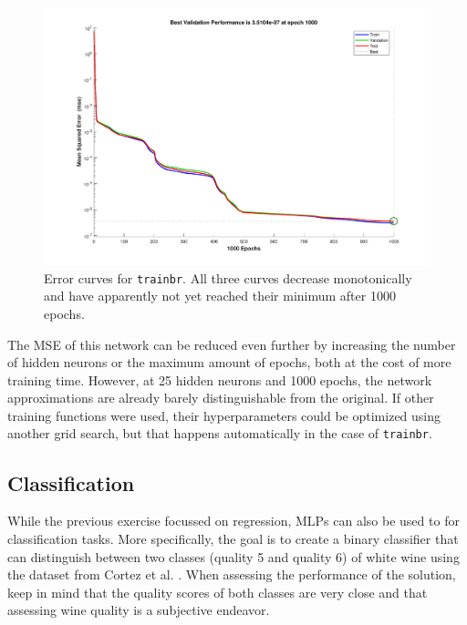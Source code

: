 \documentclass[a4, 10pt, twoside, twocolumn]{article}
\numberwithin{figure}{section}
\begin{document}
\begin{figure}[ht]
    \includegraphics[width=\linewidth]{img/Regression_trainbr_Perf.pdf}
    \caption{Error curves for \texttt{trainbr}. All three curves decrease monotonically and have apparently not yet reached their minimum after 1000 epochs.}
    \label{fig:Regression_trainbr_Perf}
\end{figure}

The MSE of this network can be reduced even further by increasing the number of hidden neurons or the maximum amount of epochs, both at the cost of more training time. However, at 25 hidden neurons and 1000 epochs, the network approximations are already barely distinguishable from the original. If other training functions were used, their hyperparameters could be optimized using another grid search, but that happens automatically in the case of \texttt{trainbr}.

\subsection{Classification}
While the previous exercise focussed on regression, MLPs can also be used to for classification tasks. More specifically, the goal is to create a binary classifier that can distinguish between two classes (quality 5 and quality 6) of white wine using the dataset from Cortez et al. \cite{cortez2009modeling}. When assessing the performance of the solution, keep in mind that the quality scores of both classes are very close and that assessing wine quality is a subjective endeavor.
\end{document}
